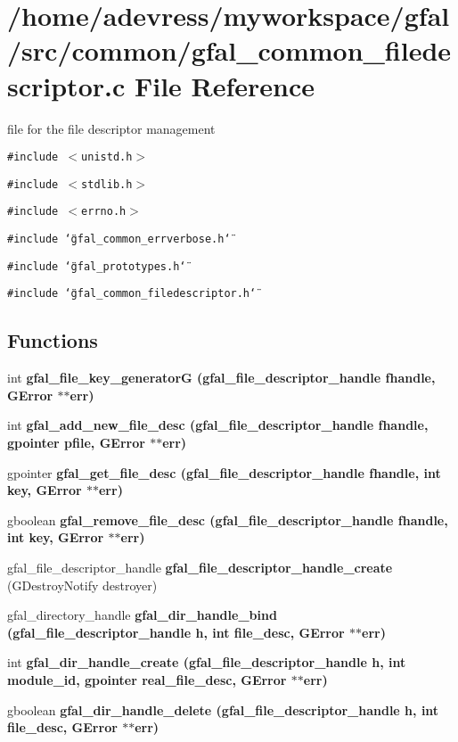 \section{/home/adevress/myworkspace/gfal/src/common/gfal\_\-common\_\-filedescriptor.c File Reference}
\label{gfal__common__filedescriptor_8c}
file for the file descriptor management 

{\tt \#include $<$unistd.h$>$}\par
{\tt \#include $<$stdlib.h$>$}\par
{\tt \#include $<$errno.h$>$}\par
{\tt \#include \char`\"{}gfal\_\-common\_\-errverbose.h\char`\"{}}\par
{\tt \#include \char`\"{}gfal\_\-prototypes.h\char`\"{}}\par
{\tt \#include \char`\"{}gfal\_\-common\_\-filedescriptor.h\char`\"{}}\par
\subsection*{Functions}
\begin{CompactItemize}
\item 
int \bf{gfal\_\-file\_\-key\_\-generator\-G} (gfal\_\-file\_\-descriptor\_\-handle fhandle, GError $\ast$$\ast$err)
\item 
int \bf{gfal\_\-add\_\-new\_\-file\_\-desc} (gfal\_\-file\_\-descriptor\_\-handle fhandle, gpointer pfile, GError $\ast$$\ast$err)
\item 
gpointer \bf{gfal\_\-get\_\-file\_\-desc} (gfal\_\-file\_\-descriptor\_\-handle fhandle, int key, GError $\ast$$\ast$err)
\item 
gboolean \bf{gfal\_\-remove\_\-file\_\-desc} (gfal\_\-file\_\-descriptor\_\-handle fhandle, int key, GError $\ast$$\ast$err)
\item 
gfal\_\-file\_\-descriptor\_\-handle \textbf{gfal\_\-file\_\-descriptor\_\-handle\_\-create} (GDestroy\-Notify destroyer)\label{gfal__common__filedescriptor_8c_9c7178945c6bcbebf9fa7b082c964480}

\item 
gfal\_\-directory\_\-handle \bf{gfal\_\-dir\_\-handle\_\-bind} (gfal\_\-file\_\-descriptor\_\-handle h, int file\_\-desc, GError $\ast$$\ast$err)
\item 
int \bf{gfal\_\-dir\_\-handle\_\-create} (gfal\_\-file\_\-descriptor\_\-handle h, int module\_\-id, gpointer real\_\-file\_\-desc, GError $\ast$$\ast$err)
\item 
gboolean \bf{gfal\_\-dir\_\-handle\_\-delete} (gfal\_\-file\_\-descriptor\_\-handle h, int file\_\-desc, GError $\ast$$\ast$err)
\end{CompactItemize}


